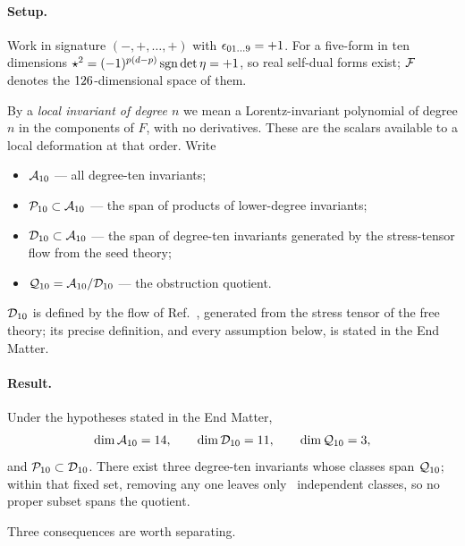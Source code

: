 \documentclass[aps,prl,reprint,superscriptaddress,nofootinbib,floatfix]{revtex4-2}
\begin{document}
\paragraph*{Setup.}
Work in signature $(-,+,\dots,+)$ with $\epsilon_{01\ldots9}=+1$. For a five-form in
ten dimensions $\star^2 = (-1)^{p(d-p)}\operatorname{sgn}\det\eta = +1$, so real self-dual
forms exist; $\mathcal{F}$ denotes the $126$-dimensional space of them.

By a \emph{local invariant of degree $n$} we mean a Lorentz-invariant polynomial
of degree $n$ in the components of $F$, with no derivatives. These are the
scalars available to a local deformation at that order. Write

\begin{itemize}\itemsep2pt
\item $\mathcal{A}_{10}$ --- all degree-ten invariants;
\item $\mathcal{P}_{10} \subset \mathcal{A}_{10}$ --- the span of products of lower-degree invariants;
\item $\mathcal{D}_{10} \subset \mathcal{A}_{10}$ --- the span of degree-ten invariants generated by
      the stress-tensor flow from the seed theory;
\item $\mathcal{Q}_{10} = \mathcal{A}_{10}/\mathcal{D}_{10}$ --- the obstruction quotient.
\end{itemize}

$\mathcal{D}_{10}$ is defined by the flow of Ref.~\cite{Hutomo:2025chiral}, generated from
the stress tensor of the free theory; its precise definition, and every
assumption below, is stated in the End Matter.

\paragraph*{Result.}
\begin{theorem}
Under the hypotheses stated in the End Matter,
\begin{equation}
  \dim\mathcal{A}_{10} = 14,\qquad
  \dim\mathcal{D}_{10} = 11,\qquad
  \dim\mathcal{Q}_{10} = 3 ,
  \label{eq:main}
\end{equation}
and $\mathcal{P}_{10} \subset \mathcal{D}_{10}$. There exist three degree-ten invariants whose classes
span $\mathcal{Q}_{10}$; within that fixed set, removing any one leaves only
\dimQtenMinusOne\ independent classes, so no proper subset spans the quotient.
\end{theorem}

Three consequences are worth separating.
\end{document}

